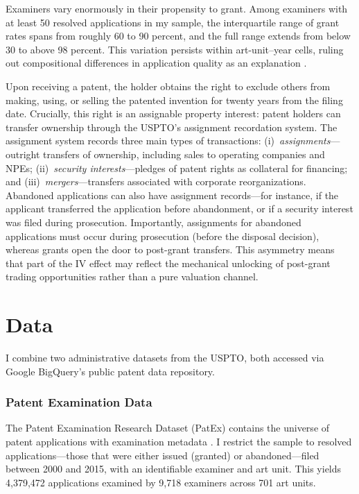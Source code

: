 \documentclass[12pt]{article}
\begin{document}
Examiners vary enormously in their propensity to grant. Among examiners with at least 50 resolved applications in my sample, the interquartile range of grant rates spans from roughly 60 to 90 percent, and the full range extends from below 30 to above 98 percent. This variation persists within art-unit--year cells, ruling out compositional differences in application quality as an explanation \citep{frakes2017time}.

Upon receiving a patent, the holder obtains the right to exclude others from making, using, or selling the patented invention for twenty years from the filing date. Crucially, this right is an assignable property interest: patent holders can transfer ownership through the USPTO's assignment recordation system. The assignment system records three main types of transactions: (i)~\textit{assignments}---outright transfers of ownership, including sales to operating companies and NPEs; (ii)~\textit{security interests}---pledges of patent rights as collateral for financing; and (iii)~\textit{mergers}---transfers associated with corporate reorganizations. Abandoned applications can also have assignment records---for instance, if the applicant transferred the application before abandonment, or if a security interest was filed during prosecution. Importantly, assignments for abandoned applications must occur during prosecution (before the disposal decision), whereas grants open the door to post-grant transfers. This asymmetry means that part of the IV effect may reflect the mechanical unlocking of post-grant trading opportunities rather than a pure valuation channel.


\section{Data}
\label{sec:data}

I combine two administrative datasets from the USPTO, both accessed via Google BigQuery's public patent data repository.

\subsubsection*{Patent Examination Data} The Patent Examination Research Dataset (PatEx) contains the universe of patent applications with examination metadata \citep{marco2015patent}. I restrict the sample to resolved applications---those that were either issued (granted) or abandoned---filed between 2000 and 2015, with an identifiable examiner and art unit. This yields 4,379,472 applications examined by 9,718 examiners across 701 art units.
\end{document}
